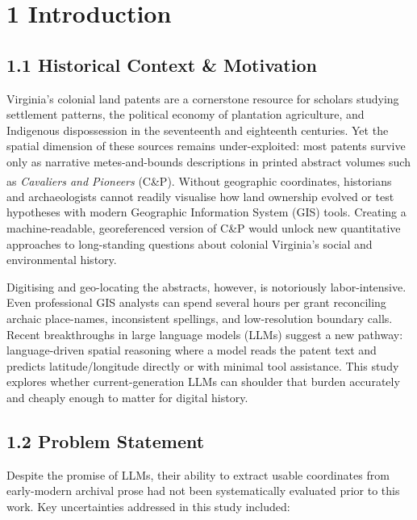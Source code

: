 \documentclass[
  10pt,
  twocolumn]{article}
\begin{document}
\section{1 Introduction}\label{introduction}

\subsection{1.1 Historical Context \&
Motivation}\label{historical-context-motivation}

Virginia's colonial land patents are a cornerstone resource for scholars
studying settlement patterns, the political economy of plantation
agriculture, and Indigenous dispossession in the seventeenth and
eighteenth centuries. Yet the spatial dimension of these sources remains
under-exploited: most patents survive only as narrative metes-and-bounds
descriptions in printed abstract volumes such as \emph{Cavaliers and
Pioneers}
(C\&P)\textsuperscript{}. Without
geographic coordinates, historians and archaeologists cannot readily
visualise how land ownership evolved or test hypotheses with modern
Geographic Information System (GIS) tools. Creating a machine-readable,
georeferenced version of C\&P would unlock new quantitative approaches
to long-standing questions about colonial Virginia's social and
environmental history.

Digitising and geo-locating the abstracts, however, is notoriously
labor-intensive. Even professional GIS analysts can spend several hours
per grant reconciling archaic place-names, inconsistent spellings, and
low-resolution boundary calls. Recent breakthroughs in large language
models (LLMs) suggest a new pathway: language-driven spatial reasoning
where a model reads the patent text and predicts latitude/longitude
directly or with minimal tool assistance. This study explores whether
current-generation LLMs can shoulder that burden accurately and cheaply
enough to matter for digital history.

\subsection{1.2 Problem Statement}\label{problem-statement}

Despite the promise of LLMs, their ability to extract usable coordinates
from early-modern archival prose had not been systematically evaluated
prior to this work. Key uncertainties addressed in this study included:
\end{document}
